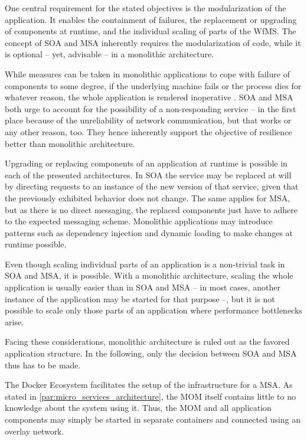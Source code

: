   One central requirement for the stated objectives is the modularization of the application. It enables the containment of failures, the replacement or upgrading of components at runtime, and the individual scaling of parts of the \ac{WfMS}. The concept of \ac{SOA} and \ac{MSA} inherently requires the modularization of code, while it is optional -- yet, advisable -- in a monolithic architecture.

  While measures can be taken in monolithic applications to cope with failure of components to some degree, if the underlying machine fails or the process dies for whatever reason, the whole application is rendered inoperative \cite[p.~55]{Newman2015Building}. \ac{SOA} and \ac{MSA} both urge to account for the possibility of a non-responding service -- in the first place because of the unreliability of network communication, but that works or any other reason, too. They hence inherently support the objective of resilience better than monolithic architecture.

  Upgrading or replacing components of an application at runtime is possible in each of the presented architectures. In \ac{SOA} the service may be replaced at will by directing requests to an instance of the new version of that service, given that the previously exhibited behavior does not change. The same applies for \ac{MSA}, but as there is no direct messaging, the replaced components just have to adhere to the expected messaging scheme. Monolithic applications may introduce patterns such as dependency injection and dynamic loading to make changes at runtime possible.

  Even though scaling individual parts of an application is a non-trivial task in \ac{SOA} and \ac{MSA}, it is possible. With a monolithic architecture, scaling the whole application is usually easier than in \ac{SOA} and \ac{MSA} -- in most cases, another instance of the application may be started for that purpose --, but it is not possible to scale only those parts of an application where performance bottlenecks arise.

  Facing these considerations, monolithic architecture is ruled out as the favored application structure. In the following, only the decision between \ac{SOA} and \ac{MSA} thus has to be made.

  The Docker Ecosystem facilitates the setup of the infrastructure for a \ac{MSA}. As stated in \ref{par:micro_services_architecture}, the \ac{MOM} itself contains little to no knowledge about the system using it. Thus, the \ac{MOM} and all application components may simply be started in separate containers and connected using an overlay network.

